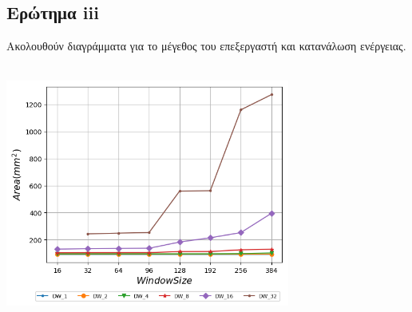 \subsection{Ερώτημα iii}
   Ακολουθούν διαγράμματα για το μέγεθος του επεξεργαστή και κατανάλωση ενέργειας.    
   \\
   \begin{minipage}{\textwidth}
      \begin{center}
         \\
         \vspace{3mm}
         \includegraphics[width=0.7\textwidth]{./graphs/area/area.png}
         \vspace{6mm}
      \end{center}
   \end{minipage}

